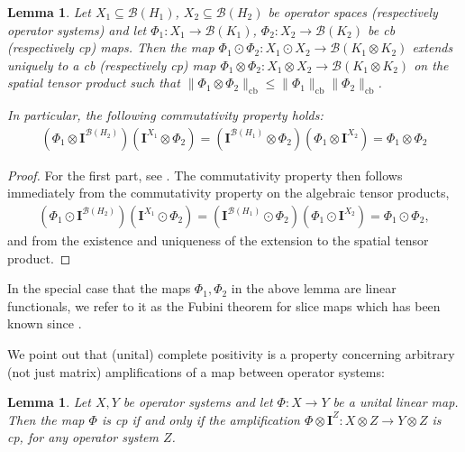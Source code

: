 \documentclass{amsart}
\theoremstyle{plain}
\newtheorem{lemma}[theorem]{Lemma}
\theoremstyle{definition}
\theoremstyle{remark}
\begin{document}
	\begin{lemma}\label{lem:Fubini-for-cb-maps}
		Let $X_1 \subseteq \mathcal{B}(H_1)$, $X_2 \subseteq \mathcal{B}(H_2)$ be operator spaces (respectively operator systems) and let $\Phi_1 : X_1 \rightarrow \mathcal{B}(K_1)$, $\Phi_2 : X_2 \rightarrow \mathcal{B}(K_2)$ be cb (respectively cp) maps.
		Then the map $\Phi_1 \odot \Phi_2 : X_1 \odot X_2 \rightarrow \mathcal{B}(K_1 \otimes K_2)$ extends uniquely to a cb (respectively cp) map $\Phi_1 \otimes \Phi_2 : X_1 \otimes X_2 \rightarrow \mathcal{B}(K_1 \otimes K_2)$ on the spatial tensor product such that $\lVert\Phi_1 \otimes \Phi_2\rVert_\mathrm{cb} \leq \lVert\Phi_1\rVert_\mathrm{cb} \lVert\Phi_2\rVert_\mathrm{cb}$.
		
		In particular, the following commutativity property holds:
		\begin{align}
			(\Phi_1 \otimes \mathbf{I}^{\mathcal{B}(H_2)}) (\mathbf{I}^{X_1} \otimes \Phi_2)
			= (\mathbf{I}^{\mathcal{B}(H_1)} \otimes \Phi_2) (\Phi_1 \otimes \mathbf{I}^{X_2})
			= \Phi_1 \otimes \Phi_2
		\end{align}
	\end{lemma}
	
	\begin{proof}
		For the first part, see \cite[Theorem 12.3]{Pau02}.
		The commutativity property then follows immediately from the commutativity property on the algebraic tensor products,
		\begin{align}
			(\Phi_1 \odot \mathbf{I}^{\mathcal{B}(H_2)}) (\mathbf{I}^{X_1} \odot \Phi_2)
			= (\mathbf{I}^{\mathcal{B}(H_1)} \odot \Phi_2) (\Phi_1 \odot \mathbf{I}^{X_2})
			= \Phi_1 \odot \Phi_2,
		\end{align}
		and from the existence and uniqueness of the extension to the spatial tensor product.
	\end{proof}
	
	In the special case that the maps $\Phi_1, \Phi_2$ in the above lemma are linear functionals, we refer to it as the Fubini theorem for slice maps which has been known since \cite{Tom67}.
	
	We point out that (unital) complete positivity is a property concerning arbitrary (not just matrix) amplifications of a map between operator systems:
	
	\begin{lemma}
		Let $X, Y$ be operator systems and let $\Phi : X \rightarrow Y$ be a unital linear map.
		Then the map $\Phi$ is cp if and only if the amplification $\Phi \otimes \mathbf{I}^Z : X \otimes Z \rightarrow Y \otimes Z$ is cp, for any operator system $Z$.
	\end{lemma}
	
\end{document}
